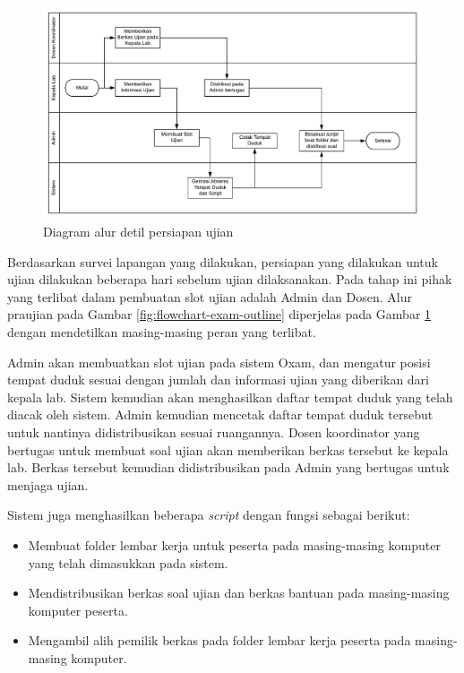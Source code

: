         \begin{figure}
            \centering
            \includegraphics[width=0.75\paperwidth]{Gambar/flowchart/exam-flow-ujian-pra.pdf}
            \caption{Diagram alur detil persiapan ujian}
            \label{fig:flowchart-exam-preexam}
        \end{figure}
        
        Berdasarkan survei lapangan yang dilakukan, persiapan yang dilakukan
        untuk ujian dilakukan beberapa hari sebelum ujian dilaksanakan. Pada
        tahap ini pihak yang terlibat dalam pembuatan slot ujian adalah Admin
        dan Dosen. Alur praujian pada Gambar \ref{fig:flowchart-exam-outline}
        diperjelas pada Gambar \ref{fig:flowchart-exam-preexam} dengan
        mendetilkan masing-masing peran yang terlibat.
        
        
        Admin akan membuatkan slot ujian pada sistem Oxam, dan mengatur posisi
        tempat duduk sesuai dengan jumlah dan informasi ujian yang diberikan
        dari kepala lab. Sistem kemudian akan menghasilkan daftar tempat duduk
        yang telah diacak oleh sistem. Admin kemudian mencetak daftar tempat
        duduk tersebut untuk nantinya didistribusikan sesuai ruangannya. Dosen
        koordinator yang bertugas untuk membuat soal ujian akan memberikan
        berkas tersebut ke kepala lab. Berkas tersebut kemudian didistribusikan
        pada Admin yang bertugas untuk menjaga ujian.
        
        Sistem juga menghasilkan beberapa \textit{script} dengan fungsi sebagai
        berikut:
        \begin{itemize}
            \item Membuat folder lembar kerja untuk peserta pada masing-masing
            komputer yang telah dimasukkan pada sistem.
            \item Mendistribusikan berkas soal ujian dan berkas bantuan pada
            masing-masing komputer peserta.
            \item Mengambil alih pemilik berkas pada folder lembar kerja peserta
            pada masing-masing komputer.
        \end{itemize}
        
